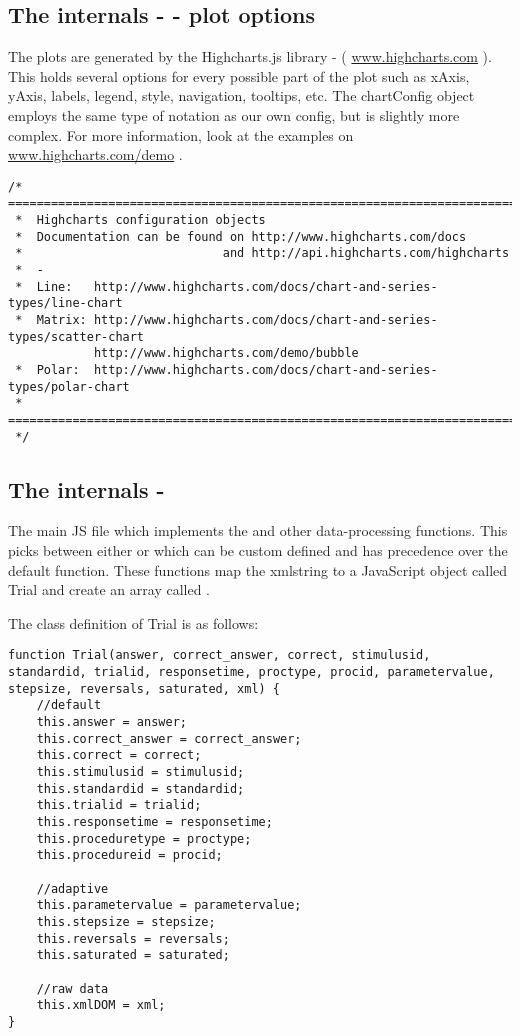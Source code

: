 \subsection{The internals -  - plot options}

The plots are generated by the Highcharts.js library - ( \url{www.highcharts.com} ). This holds several options for every possible part of the plot such as xAxis, yAxis, labels, legend, style, navigation, tooltips, etc.
The chartConfig object employs the same type of notation as our own config, but is slightly more complex. For more information, look at the examples on \url{www.highcharts.com/demo} .

\begin{lstlisting}
/*  ============================================================================
 *  Highcharts configuration objects
 *  Documentation can be found on http://www.highcharts.com/docs
 *                            and http://api.highcharts.com/highcharts
 *  -
 *  Line:   http://www.highcharts.com/docs/chart-and-series-types/line-chart
 *  Matrix: http://www.highcharts.com/docs/chart-and-series-types/scatter-chart
            http://www.highcharts.com/demo/bubble
 *  Polar:  http://www.highcharts.com/docs/chart-and-series-types/polar-chart
 *  ============================================================================
 */
\end{lstlisting}


\subsection{The internals - }
The main JS file which implements the  and other data-processing functions. This picks between either  or  which can be custom defined and has precedence over the default function. These functions map the xmlstring to a JavaScript object called Trial and create an array called .

The class definition of Trial is as follows:
\begin{lstlisting}
function Trial(answer, correct_answer, correct, stimulusid, standardid, trialid, responsetime, proctype, procid, parametervalue, stepsize, reversals, saturated, xml) {
    //default
    this.answer = answer;
    this.correct_answer = correct_answer;
    this.correct = correct;
    this.stimulusid = stimulusid;
    this.standardid = standardid;
    this.trialid = trialid;
    this.responsetime = responsetime;
    this.proceduretype = proctype;
    this.procedureid = procid;

    //adaptive
    this.parametervalue = parametervalue;
    this.stepsize = stepsize;
    this.reversals = reversals;
    this.saturated = saturated;

    //raw data
    this.xmlDOM = xml;
}
\end{lstlisting}

